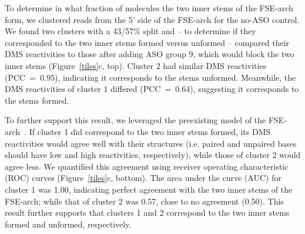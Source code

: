 \documentclass[main.tex]{subfiles}
\begin{document}
To determine in what fraction of molecules the two inner stems of the FSE-arch form, we clustered reads from the 5' side of the FSE-arch for the no-ASO control.
We found two clusters with a 43/57\% split and -- to determine if they corresponded to the two inner stems formed versus unformed -- compared their DMS reactivities to those after adding ASO group 9, which would block the two inner stems (Figure~\ref{tiles}c, top).
Cluster 2 had similar DMS reactivities (PCC~=~0.95), indicating it corresponds to the stems unformed.
Meanwhile, the DMS reactivities of cluster 1 differed (PCC~=~0.64), suggesting it corresponds to the stems formed.

To further support this result, we leveraged the preexisting model of the FSE-arch~\cite{Ziv2020}.
If cluster 1 did correspond to the two inner stems formed, its DMS reactivities would agree well with their structures (i.e. paired and unpaired bases should have low and high reactivities, respectively), while those of cluster 2 would agree less.
We quantified this agreement using receiver operating characteristic (ROC) curves (Figure~\ref{tiles}c, bottom).
The area under the curve (AUC) for cluster 1 was 1.00, indicating perfect agreement with the two inner stems of the FSE-arch; while that of cluster 2 was 0.57, close to no agreement (0.50).
This result further supports that clusters 1 and 2 correspond to the two inner stems formed and unformed, respectively.
\end{document}
